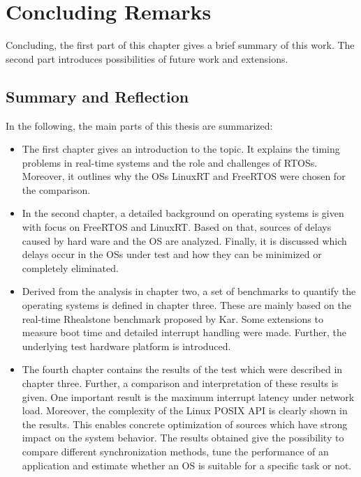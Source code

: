 \chapter{Concluding Remarks}\label{ch_conclusion}
Concluding, the first part of this chapter gives a brief summary of this work.
The second part introduces possibilities of future work and extensions.

\section{Summary and Reflection}   
In the following, the main parts of this thesis are summarized:

\begin{itemize}
	\item 
	The first chapter gives an introduction to the topic. 
	It explains the timing problems in real-time systems and the role and challenges of \acp{RTOS}.
	Moreover, it outlines why the \acp{OS} LinuxRT and FreeRTOS were chosen for the comparison.
	\item
	In the second chapter, a detailed background on operating systems is given with focus on FreeRTOS and LinuxRT.
	Based on that, sources of delays caused by hard ware and the \ac{OS} are analyzed.
	Finally, it is discussed which delays occur in the \acp{OS} under test and how they can be minimized or completely eliminated.
	\item
	Derived from the analysis in chapter two, a set of benchmarks to quantify the operating systems is defined in chapter three.
	These are mainly based on the real-time Rhealstone benchmark proposed by Kar.
	Some extensions to measure boot time and detailed interrupt handling were made.
	Further, the underlying test hardware platform is introduced.
	\item
	The fourth chapter contains the results of the test which were described in chapter three.
	Further, a comparison and interpretation of these results is given.
	One important result is the maximum interrupt latency under network load.
	Moreover, the complexity of the Linux POSIX \ac{API} is clearly shown in the results.
	This enables concrete optimization of sources which have strong impact on the system behavior.	
	The results obtained give the possibility to compare different synchronization methods, tune the performance of an application and estimate whether an \ac{OS} is suitable for a specific task or not.
\end{itemize}

